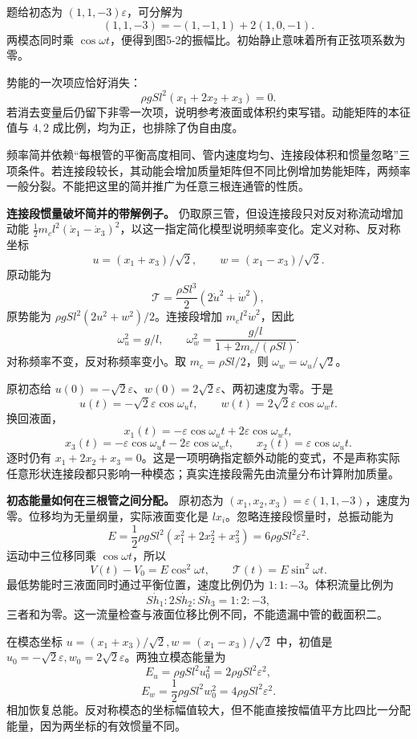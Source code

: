 \documentclass[12pt,a4paper,UTF8]{ctexart}
\begin{document}
题给初态为 \((1,1,-3)\varepsilon\)，可分解为 \[
(1,1,-3)=-(1,-1,1)+2(1,0,-1).
\] 两模态同时乘
\(\cos\omega t\)，便得到图5-2的振幅比。初始静止意味着所有正弦项系数为零。

势能的一次项应恰好消失： \[
\rho gSl^2(x_1+2x_2+x_3)=0.
\]
若消去变量后仍留下非零一次项，说明参考液面或体积约束写错。动能矩阵的本征值与
\(4,2\) 成比例，均为正，也排除了伪自由度。

频率简并依赖``每根管的平衡高度相同、管内速度均匀、连接段体积和惯量忽略''三项条件。若连接段较长，其动能会增加质量矩阵但不同比例增加势能矩阵，两频率一般分裂。不能把这里的简并推广为任意三根连通管的性质。

\textbf{连接段惯量破坏简并的带解例子。}
仍取原三管，但设连接段只对反对称流动增加动能
\(\frac12m_c l^2(\dot x_1-\dot x_3)^2\)，以这一指定简化模型说明频率变化。定义对称、反对称坐标
\[
u=(x_1+x_3)/\sqrt2,\qquad w=(x_1-x_3)/\sqrt2.
\] 原动能为 \[
\mathcal T=\frac{\rho Sl^3}{2}(2\dot u^2+\dot w^2),
\] 原势能为 \(\rho gSl^2(2u^2+w^2)/2\)。连接段增加
\(m_cl^2\dot w^2\)，因此 \[
\omega_u^2=g/l,
\qquad
\omega_w^2=\frac{g/l}{1+2m_c/(\rho Sl)}.
\] 对称频率不变，反对称频率变小。取 \(m_c=\rho Sl/2\)，则
\(\omega_w=\omega_u/\sqrt2\)。

原初态给
\(u(0)=-\sqrt2\varepsilon\)、\(w(0)=2\sqrt2\varepsilon\)、两初速度为零。于是
\[
u(t)=-\sqrt2\varepsilon\cos\omega_ut,
\qquad w(t)=2\sqrt2\varepsilon\cos\omega_wt.
\] 换回液面， \[
x_1(t)=-\varepsilon\cos\omega_ut+2\varepsilon\cos\omega_wt,
\] \[
x_3(t)=-\varepsilon\cos\omega_ut-2\varepsilon\cos\omega_wt,
\qquad x_2(t)=\varepsilon\cos\omega_ut.
\] 逐时仍有
\(x_1+2x_2+x_3=0\)。这是一项明确指定额外动能的变式，不是声称实际任意形状连接段都只影响一种模态；真实连接段需先由流量分布计算附加质量。

\textbf{初态能量如何在三根管之间分配。} 原初态为
\((x_1,x_2,x_3)=\varepsilon(1,1,-3)\)，速度为零。位移均为无量纲量，实际液面变化是
\(lx_i\)。忽略连接段惯量时，总振动能为 \[
E=\frac12\rho gSl^2(x_1^2+2x_2^2+x_3^2)
=6\rho gSl^2\varepsilon^2.
\] 运动中三位移同乘 \(\cos\omega t\)，所以 \[
V(t)-V_0=E\cos^2\omega t,
\qquad\mathcal T(t)=E\sin^2\omega t.
\] 最低势能时三液面同时通过平衡位置，速度比例仍为
\(1:1:-3\)。体积流量比例为 \[
S\dot h_1:2S\dot h_2:S\dot h_3=1:2:-3,
\] 三者和为零。这一流量检查与液面位移比例不同，不能遗漏中管的截面积二。

在模态坐标 \(u=(x_1+x_3)/\sqrt2,w=(x_1-x_3)/\sqrt2\) 中，初值是
\(u_0=-\sqrt2\varepsilon,w_0=2\sqrt2\varepsilon\)。两独立模态能量为 \[
E_u=\rho gSl^2u_0^2=2\rho gSl^2\varepsilon^2,
\] \[
E_w=\frac12\rho gSl^2w_0^2=4\rho gSl^2\varepsilon^2.
\]
相加恢复总能。反对称模态的坐标幅值较大，但不能直接按幅值平方比四比一分配能量，因为两坐标的有效惯量不同。
\end{document}
